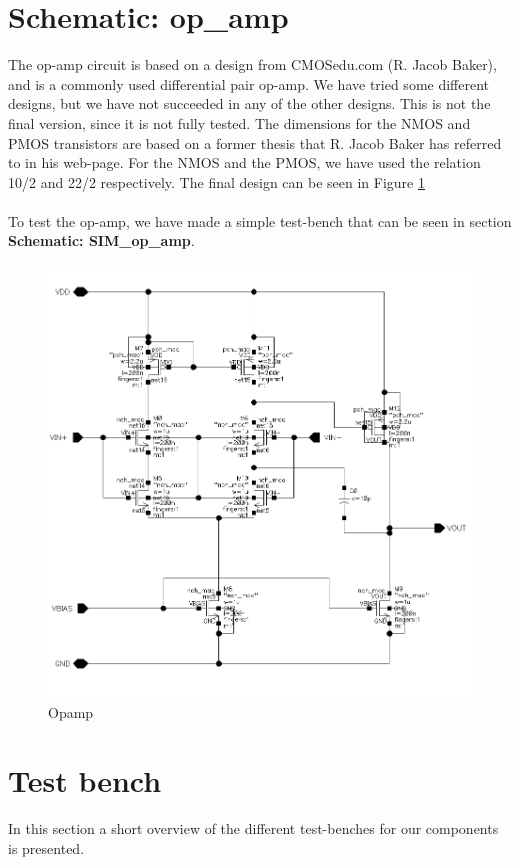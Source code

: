 \documentclass[english, a4paper,11pt]{article}
\begin{document}
\section*{Schematic: op\_amp}
The op-amp circuit is based on a design from CMOSedu.com (R. Jacob Baker), and is a commonly used differential pair op-amp. We have tried some different designs, but we have not succeeded in 
any of the other designs. This is not the final version, since it is not fully tested. The dimensions for the NMOS and PMOS transistors are based on a former thesis that R. Jacob Baker has 
referred to in his web-page. For the NMOS and the PMOS, we have used the relation 10/2 and 22/2 respectively. The final design can be seen in Figure \ref{opamp}\\
\\
To test the op-amp, we have made a simple test-bench that can be seen in section \textbf{Schematic: SIM\_op\_amp}.
\begin{figure}[!ht]
 \centering
   \includegraphics[width=\textwidth]{img/op_amp_3}
   \caption{Opamp}
   \label{opamp}
\end{figure}


\section{Test bench}
In this section a short overview of the different test-benches for our components is presented.
\end{document}
